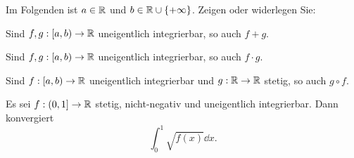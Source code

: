 \begin{Problem}
	Im Folgenden ist $a\in \mathbb{R}$ und $b\in \mathbb{R} \cup \left\{ +\infty \right\} $. Zeigen oder widerlegen Sie:
	\begin{parts}
		\item Sind $f,g:[a,b)\to \mathbb{R}$ uneigentlich integrierbar, so auch $f+g$.
		\item Sind $f,g:[a,b)\to \mathbb{R}$ uneigentlich integrierbar, so auch $f\cdot g$.
		\item Sind $f:[a,b)\to \mathbb{R}$ uneigentlich integrierbar und $g:\mathbb{R} \to \mathbb{R}$ stetig, so auch $g\circ f$.
		\item Es sei $f:(0,1]\to \mathbb{R}$ stetig, nicht-negativ und uneigentlich integrierbar. Dann konvergiert
			\[
				\int_0^1 \sqrt{f(x)} \dd{x}
			.\] 
	\end{parts}
\end{Problem}
